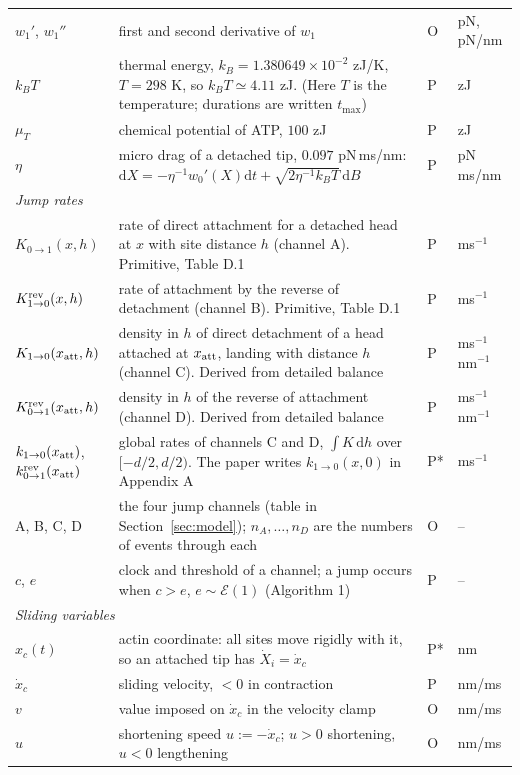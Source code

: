 \documentclass[11pt,a4paper]{article}
\newcommand{\kBT}{k_BT}
\newcommand{\dd}{\mathrm{d}}
\begin{document}
{\begin{longtable}{p{2.5cm}p{8.5cm}p{1.0cm}p{1.9cm}}
$w_1'$, $w_1''$ & first and second derivative of $w_1$ & O & pN, pN/nm\\
$\kBT$ & thermal energy, $k_B=1.380649\times10^{-2}$ zJ/K, $T=298$ K, so $\kBT\simeq4.11$ zJ. (Here $T$ is the temperature; durations are written $t_{\max}$) & P & zJ\\
$\mu_T$ & chemical potential of ATP, $100$ zJ & P & zJ\\
$\eta$ & micro drag of a detached tip, $0.097$ pN\,ms/nm: $\dd X=-\eta^{-1}w_0'(X)\dd t+\sqrt{2\eta^{-1}\kBT}\,\dd B$ & P & pN\,ms/nm\\
\midrule
\multicolumn{4}{l}{\emph{Jump rates}}\\
$K_{0\to1}(x,h)$ & rate of direct attachment for a detached head at $x$ with site distance $h$ (channel A). Primitive, Table D.1 & P & ms$^{-1}$\\
$K^{\rm rev}_{1\to0}(x,h)$ & rate of attachment by the reverse of detachment (channel B). Primitive, Table D.1 & P & ms$^{-1}$\\
$K_{1\to0}(x_{\rm att},h)$ & density in $h$ of direct detachment of a head attached at $x_{\rm att}$, landing with distance $h$ (channel C). Derived from detailed balance & P & ms$^{-1}$nm$^{-1}$\\
$K^{\rm rev}_{0\to1}(x_{\rm att},h)$ & density in $h$ of the reverse of attachment (channel D). Derived from detailed balance & P & ms$^{-1}$nm$^{-1}$\\
$k_{1\to0}(x_{\rm att})$, $k^{\rm rev}_{0\to1}(x_{\rm att})$ & global rates of channels C and D, $\int K\,\dd h$ over $[-d/2,d/2)$. The paper writes $k_{1\to0}(x,0)$ in Appendix A & P* & ms$^{-1}$\\
A, B, C, D & the four jump channels (table in Section~\ref{sec:model}); $n_A,\dots,n_D$ are the numbers of events through each & O & --\\
$c$, $e$ & clock and threshold of a channel; a jump occurs when $c>e$, $e\sim\mathcal E(1)$ (Algorithm 1) & P & --\\
\midrule
\multicolumn{4}{l}{\emph{Sliding variables}}\\
$x_c(t)$ & actin coordinate: all sites move rigidly with it, so an attached tip has $\dot X_i=\dot x_c$ & P* & nm\\
$\dot x_c$ & sliding velocity, $<0$ in contraction & P & nm/ms\\
$v$ & value imposed on $\dot x_c$ in the velocity clamp & O & nm/ms\\
$u$ & shortening speed $u:=-\dot x_c$; $u>0$ shortening, $u<0$ lengthening & O & nm/ms\\

\end{longtable}}
\end{document}
